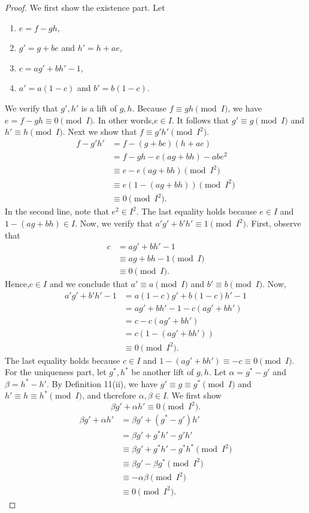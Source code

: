 \begin{proof}
We first show the existence part. Let
\begin{enumerate}\item $e=f-gh$,\item $g'=g+be$ and $h'=h+ae$,\item $c=ag'+bh'-1$,\item $a'=a(1-c)$ and $b'=b(1-c)$.\end{enumerate}
We verify that $g',h'$ is a lift of $g,h$. Because $f\equiv gh\pmod I$, we have $e=f-gh\equiv0\pmod I$. In other words,$e\in I$. It follows that $g'\equiv g\pmod I$ and $h'\equiv h\pmod I$.
Next we show that $f\equiv g'h'\pmod{I^2}$.
\begin{align*}f-g'h'&=f-(g+be)(h+ae)\\&=f-gh-e(ag+bh)-abe^2\\&\equiv e-e(ag+bh)\pmod{I^2}\\&\equiv e(1-(ag+bh))\pmod{I^2}\\&\equiv0\pmod{I^2}.\end{align*}
In the second line, note that $e^2\in I^2$. The last equality holds because $e\in I$ and $1-(ag+bh)\in I$.
Now, we verify that $a'g'+b'h'\equiv1\pmod{I^2}$. First, observe that
\begin{align*}c&=ag'+bh'-1\\&\equiv ag+bh-1\pmod I\\&\equiv0\pmod I.\end{align*}
Hence,$c\in I$ and we conclude that $a'\equiv a\pmod I$ and $b'\equiv b\pmod I$. Now,
\begin{align*}a'g'+b'h'-1&=a(1-c)g'+b(1-c)h'-1\\&=ag'+bh'-1-c(ag'+bh')\\&=c-c(ag'+bh')\\&=c(1-(ag'+bh'))\\&\equiv0\pmod{I^2}.\end{align*}
The last equality holds because $c\in I$ and $1-(ag'+bh')\equiv-c\equiv0\pmod I$.
For the uniqueness part, let $g^*,h^*$ be another lift of $g,h$. Let $\alpha=g^*-g'$ and $\beta=h^*-h'$. By Definition 11(ii), we have $g'\equiv g\equiv g^*\pmod I$ and $h'\equiv h\equiv h^*\pmod I$, and therefore $\alpha,\beta\in I$.
We first show
\begin{equation}\beta g'+\alpha h'\equiv0\pmod{I^2}.\tag{4}\end{equation}
\begin{align*}\beta g'+\alpha h'&=\beta g'+(g^*-g')h'\\&=\beta g'+g^*h'-g'h'\\&\equiv\beta g'+g^*h'-g^*h^*\pmod{I^2}\\&\equiv\beta g'-\beta g^*\pmod{I^2}\\&\equiv-\alpha\beta\pmod{I^2}\\&\equiv0\pmod{I^2}.\end{align*}

\end{proof}
